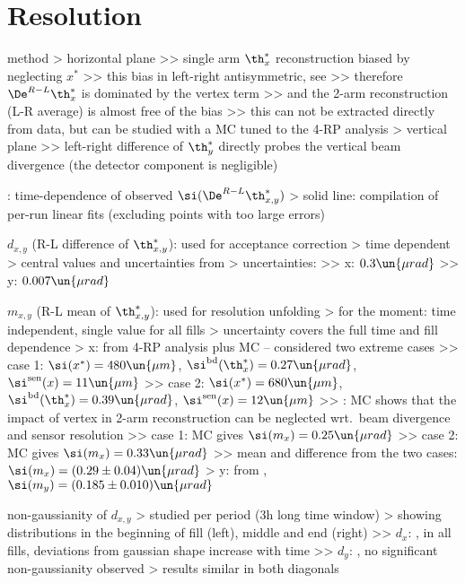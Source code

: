 \chapter[resolution]{Resolution}

\> method
\>> horizontal plane
\>>> single arm $\th_x^*$ reconstruction biased by neglecting $x^*$
\>>> this bias in left-right antisymmetric, see 
\>>> therefore $\De^{R-L} \th_x^*$ is dominated by the vertex term
\>>> and the 2-arm reconstruction (L-R average) is almost free of the bias
\>>> this can not be extracted directly from data, but can be studied with a MC tuned to the 4-RP analysis
\>> vertical plane
\>>> left-right difference of $\th_y^*$ directly probes the vertical beam divergence (the detector component is negligible)

\>  : time-dependence of observed $\si(\De^{R-L} \th_{x, y}^*)$
\>> solid line: compilation of per-run linear fits (excluding points with too large errors)

\> $d_{x, y}$ (R-L difference of $\th_{x, y}^*$): used for acceptance correction
\>> time dependent
\>> central values and uncertainties from 
\>> uncertainties:
\>>> x: $0.3\un{\mu rad}$
\>>> y: $0.007\un{\mu rad}$

\> $m_{x, y}$ (R-L mean of $\th_{x, y}^*$): used for resolution unfolding
\>> for the moment: time independent, single value for all fills
\>> uncertainty covers the full time and fill dependence
\>> x: from 4-RP analysis plus MC -- considered two extreme cases
\>>> case 1: $\si(x^*) = 480\un{\mu m}$, $\si^{\rm bd}(\th^*_x) = 0.27\un{\mu rad}$, $\si^{\rm sen}(x) = 11\un{\mu m}$
\>>> case 2: $\si(x^*) = 680\un{\mu m}$, $\si^{\rm bd}(\th^*_x) = 0.39\un{\mu rad}$, $\si^{\rm sen}(x) = 12\un{\mu m}$
\>>> : MC shows that the impact of vertex in 2-arm reconstruction can be neglected wrt.~beam divergence and sensor resolution
\>>> case 1: MC gives $\si(m_x) = 0.25\un{\mu rad}$
\>>> case 2: MC gives $\si(m_x) = 0.33\un{\mu rad}$
\>>> mean and difference from the two cases: $\si(m_x) = (0.29 \pm 0.04)\un{\mu rad}$
\>> y: from , $\si(m_y) = (0.185 \pm 0.010)\un{\mu rad}$

\> non-gaussianity of $d_{x,y}$
\>> studied per period (3h long time window)
\>> showing distributions in the beginning of fill (left), middle and end (right)
\>>> $d_x$: , in all fills, deviations from gaussian shape increase with time
\>>> $d_y$: , no significant non-gaussianity observed
\>> results similar in both diagonals

